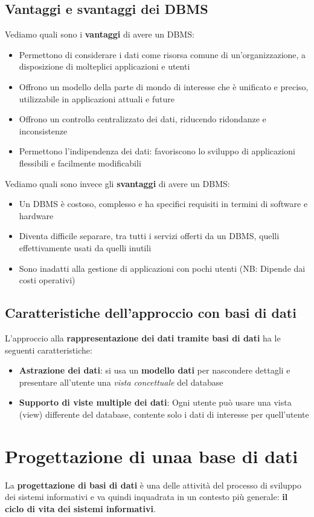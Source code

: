 \documentclass[12pt]{article}
\begin{document}
\subsection{Vantaggi e svantaggi dei DBMS}
Vediamo quali sono i \textbf{vantaggi} di avere un DBMS:
\begin{itemize}
    \item Permettono di considerare i dati come risorsa comune di un'organizzazione, a disposizione di molteplici applicazioni e utenti
    \item Offrono un modello della parte di mondo di interesse che è unificato e preciso, utilizzabile in applicazioni attuali e future
    \item Offrono un controllo centralizzato dei dati, riducendo ridondanze e inconsistenze
    \item Permettono l'indipendenza dei dati: favoriscono lo sviluppo di applicazioni flessibili e facilmente modificabili
\end{itemize}
Vediamo quali sono invece gli \textbf{svantaggi} di avere un DBMS:
\begin{itemize}
    \item Un DBMS è costoso, complesso e ha specifici requisiti in termini di software e hardware
    \item Diventa difficile separare, tra tutti i servizi offerti da un DBMS, quelli effettivamente usati da quelli inutili
    \item Sono inadatti alla gestione di applicazioni con pochi utenti (NB: Dipende dai costi operativi)
\end{itemize}
\subsection{Caratteristiche dell'approccio con basi di dati}
L'approccio alla \textbf{rappresentazione dei dati tramite basi di dati} ha le seguenti caratteristiche:
\begin{itemize}
    \item \textbf{Astrazione dei dati}: si usa un \textbf{modello dati} per nascondere dettagli e presentare all'utente una \textit{vista concettuale} del database
    \item \textbf{Supporto di viste multiple dei dati}: Ogni utente può usare una vista (view) differente del database, contente solo i dati di interesse per quell'utente
\end{itemize}
\section{Progettazione di unaa base di dati}
La \textbf{progettazione di basi di dati} è una delle attività del processo di sviluppo dei sistemi informativi e va quindi inquadrata in un contesto più generale: \textbf{il ciclo di vita dei sistemi informativi}.
\end{document}

